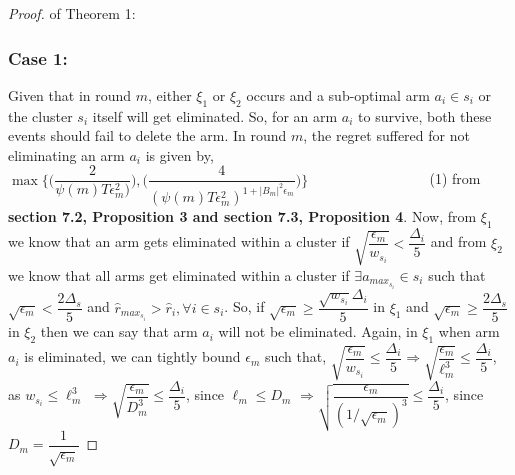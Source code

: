 \begin{proof} of Theorem 1: 
\subsubsection{Case 1:}
Given that in round $m$, either $\xi_{1}$ or $\xi_{2}$ occurs and a sub-optimal arm $a_{i}\in s_{i}$ or the cluster $s_{i}$ itself will get eliminated. So, for an arm $a_{i}$ to survive, both these events should fail to delete the arm. In round $m$, the regret suffered for not eliminating an arm $a_{i}$ is given by,
\newline
\hspace*{1em} $\max{\bigg\lbrace \bigg(\dfrac{2}{\psi(m)T\epsilon_{m}^{2})}\bigg) ,\bigg(\dfrac{4}{(\psi(m)T\epsilon_{m}^{2})^{1+|B_{m}|^{2}\epsilon_{m}}}\bigg)\bigg\rbrace}$ ~~~~~~~~~~~~~~~~ (1)
\newline
\newline from \textbf{section 7.2, Proposition 3 and section 7.3, Proposition 4}.
\newline
Now, from $\xi_{1}$ we know that an arm gets eliminated within a cluster if $\sqrt{\dfrac{\epsilon_{m}}{w_{s_{i}}}}<\dfrac{\Delta_{i}}{5}$ and from $\xi_{2}$ we know that all arms get eliminated within a cluster if $\exists a_{max_{s_{i}}}\in s_{i}$ such that $\sqrt{\epsilon_{m}}<\dfrac{2\Delta_{s}}{5}$ and $\hat{r}_{max_{s_{i}}}>\hat{r}_{i},\forall i\in s_{i}$. So, if $\sqrt{\epsilon_{m}}\geq\dfrac{\sqrt{w_{s_{i}}}\Delta_{i}}{5}$ in $\xi_{1}$ and $\sqrt{\epsilon_{m}}\geq\dfrac{2\Delta_{s}}{5}$ in $\xi_{2}$ then we can say that arm $a_{i}$ will not be eliminated. 
\newline
\newline
Again, in $\xi_{1}$ when arm $a_{i}$ is eliminated, we can tightly bound $\epsilon_{m}$ such that,
\newline
$\sqrt{\dfrac{\epsilon_{m}}{w_{s_{i}}}}\leq\dfrac{\Delta_{i}}{5}\Rightarrow \sqrt{\dfrac{\epsilon_{m}}{\ell_{m}^{3}}}\leq\dfrac{\Delta_{i}}{5}$, as $w_{s_{i}}\leq \ell_{m}^{3}$
\newline 
\hspace*{5em}$\Rightarrow \sqrt{\dfrac{\epsilon_{m}}{D_{m}^{3}}}\leq\dfrac{\Delta_{i}}{5}$, since $\ell_{m}\leq D_{m}$
\newline
\hspace*{5em}$\Rightarrow \sqrt{\dfrac{\epsilon_{m}}{(1/\sqrt{\epsilon_{m}})^{3}}}\leq\dfrac{\Delta_{i}}{5}$, since $D_{m}=\dfrac{1}{\sqrt{\epsilon_{m}}}$

\end{proof}
